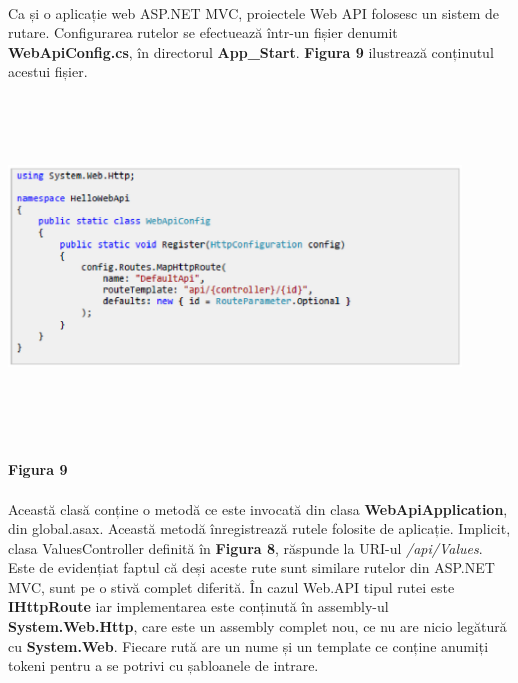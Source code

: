 \paragraph{} Ca și o aplicație web ASP.NET MVC, proiectele Web API folosesc un sistem de rutare. Configurarea rutelor se efectuează într-un fișier denumit \textbf{WebApiConfig.cs}, în directorul \textbf{App\_Start}. \textbf{Figura 9} ilustrează conținutul acestui fișier.\cite{19}

\begin{center}
\includegraphics[width=12cm,height=9cm,keepaspectratio]{imagini/RutareAPI.eps} %
\paragraph{}
\textbf{Figura 9}
\end{center}\newpage


\paragraph{} Această clasă conține o metodă ce este invocată din clasa \textbf{WebApiApplication}, din global.asax. Această metodă înregistrează rutele folosite de aplicație. Implicit, clasa ValuesController definită în \textbf{Figura 8}, răspunde la URI-ul \textit{/api/Values}. Este de evidențiat faptul că deși aceste rute sunt similare rutelor din ASP.NET MVC, sunt pe o stivă complet diferită. În cazul Web.API tipul rutei este \textbf{IHttpRoute} iar implementarea este conținută în assembly-ul \textbf{System.Web.Http}, care este un assembly complet nou, ce nu are nicio legătură cu \textbf{System.Web}. Fiecare rută are un nume și un template ce conține anumiți tokeni pentru a se potrivi cu șabloanele de intrare.\cite{19}


